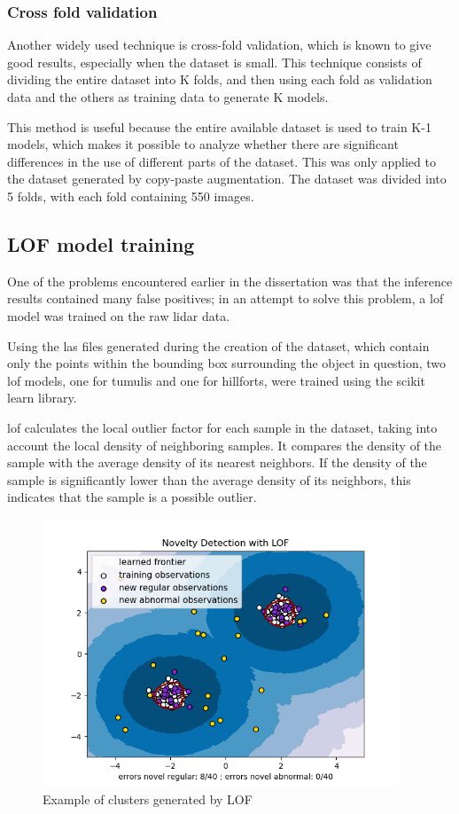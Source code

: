\subsubsection{Cross fold validation}
Another widely used technique is cross-fold validation, which is known to give good results, especially when the dataset is small. This technique consists of dividing the entire dataset into K folds, and then using each fold as validation data and the others as training data to generate K models.

This method is useful because the entire available dataset is used to train K-1 models, which makes it possible to analyze whether there are significant differences in the use of different parts of the dataset.
This was only applied to the dataset generated by copy-paste augmentation. The dataset was divided into 5 folds, with each fold containing 550 images.

\subsection{LOF model training}
One of the problems encountered earlier in the dissertation was that the inference results contained many false positives; in an attempt to solve this problem, a \ac{lof} model was trained on the raw \ac{lidar} data.

Using the las files generated during the creation of the dataset, which contain only the points within the bounding box surrounding the object in question, two \ac{lof} models, one for tumulis and one for hillforts, were trained using the scikit learn library\cite{lof}.

\ac{lof} calculates the local outlier factor for each sample in the dataset, taking into account the local density of neighboring samples. It compares the density of the sample with the average density of its nearest neighbors. If the density of the sample is significantly lower than the average density of its neighbors, this indicates that the sample is a possible outlier.

\begin{figure}[H]
\centering
\includegraphics[height=8cm]{images/lof_example.png}
\caption{Example of clusters generated by LOF\cite{lof}}
\end{figure}

